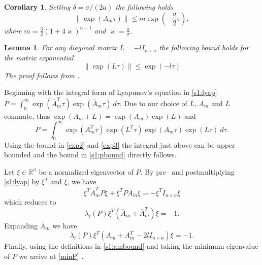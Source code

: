 \documentclass[10pt,journal]{IEEEtran}
\theoremstyle{plain}%
\newtheorem{lem}[thm]{Lemma}
\newtheorem{cor}[thm]{Corollary}
\theoremstyle{definition}
\newcommand{\be}[0]{\begin{equation}}
\newcommand{\ee}[0]{\end{equation}}
\newcommand{\ben}[0]{\begin{equation*}}
\newcommand{\een}[0]{\end{equation*}}
\newcommand{\norms}[1]{\lVert#1\rVert}
\newcommand{\normB}[0]{\norms}
\let\norm=\normB
\renewcommand{\Re}[0]{\mathbb R}
\begin{document}
\begin{cor}
Setting $\delta = \sigma/(2a)$ the following holds
\be\label{exp2}
\norm {\exp(A_m \tau)} \leq m \exp\left(-\frac \sigma 2 \tau\right),
\ee
where $m =\frac{3}{2} \left(1+4 \varkappa\right)^{n-1}$ and ${\varkappa = \frac a \sigma}$. 
\end{cor}

\begin{lem}
For any diagonal matrix ${L=-lI_{n\times n}}$ the following bound holds for the matrix exponential
\be\label{exp3}
\norm {\exp(L \tau )}  \leq  \exp(- l  \tau) 
\ee
The proof follows from \cite[Section 2]{loa77}.
\end{lem}

\begin{IEEEproof}
Beginning with the integral form of Lyapunov's equation in \eqref{s1:lyap}
${P=\int_0^\infty\exp(\bar A_m^T \tau)\exp(\bar A_m \tau)\ d\tau}.$ Due to our choice of $L$, $A_m$ and $L$ commute, thus ${\exp(A_m+L)=\exp(A_m)\exp(L)}$ and
\ben \label{app3:p}
P =   \int_0^\infty \exp(A_m^T\tau) \exp(L^T\tau)  \exp(A_m \tau)\exp(L \tau)\ d\tau.
\een
Using the bound in \eqref{exp2} and \eqref{exp3} the integral just above can be upper bounded and the bound in \eqref{s1:pbound} directly follows.\end{IEEEproof}



\begin{IEEEproof}
Let $\xi\in\Re^n$ be a normalized eigenvector of $P$. By pre-- and postmultiplying \eqref{s1:lyap} by $\xi^T$ and $\xi$, we have 
\ben
\xi^T \bar A_m^TP \xi + \xi^T P\bar A_m \xi =- \xi^TI_{n\times n} \xi
\een
which reduces to 
\ben
 \lambda_i (P) \xi^T (\bar A_m +\bar A_m^T)\xi =-1.
\een
Expanding $\bar A_m$ we have
\ben
 \lambda_i (P) \xi^T ( A_m + A_m^T-2 l I_{n\times n }) \xi =-1.
\een
Finally, using the definitions in \eqref{s1:ambound} and taking the minimum eigenvalue of $P$ we arrive at \eqref{minP} \cite{mor84}.
\end{IEEEproof}
\end{document}
